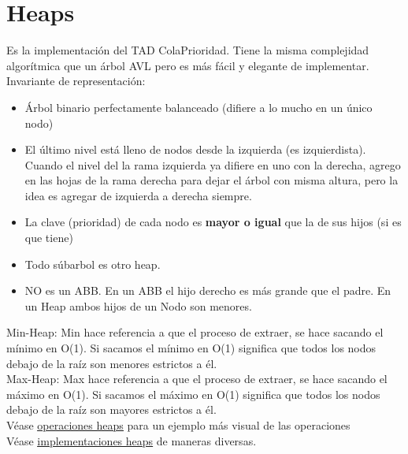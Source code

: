 \documentclass[10pt,a4paper]{article}
\begin{document}
\section*{Heaps}
Es la implementación del TAD ColaPrioridad. Tiene la misma complejidad algorítmica que un árbol AVL pero es más fácil y elegante de implementar. \\
Invariante de representación:
\begin{itemize}
    \item Árbol binario perfectamente balanceado (difiere a lo mucho en un único nodo)
    \item El último nivel está lleno de nodos desde la izquierda (es izquierdista). Cuando el nivel del la rama izquierda ya difiere en uno con la derecha, agrego en las hojas de la rama derecha para dejar el árbol con misma altura, pero la idea es agregar de izquierda a derecha siempre. 
    \item La clave (prioridad) de cada nodo es \textbf{mayor o igual} que la de sus hijos (si es que tiene)
    \item Todo súbarbol es otro heap. 
    \item NO es un ABB. En un ABB el hijo derecho es más grande que el padre. En un Heap ambos hijos de un Nodo son menores.
\end{itemize}
Min-Heap: Min hace referencia a que el proceso de extraer, se hace sacando el mínimo en O(1). Si sacamos el mínimo en O(1) significa que todos los nodos debajo de la raíz son menores estrictos a él. \\
Max-Heap: Max hace referencia a que el proceso de extraer, se hace sacando el máximo en O(1). Si sacamos el máximo en O(1) significa que todos los nodos debajo de la raíz son mayores estrictos a él. \\

Véase \hyperref[subsec:operaciones_heaps]{\underline{operaciones heaps}} para un ejemplo más visual de las operaciones \\
Véase \hyperref[subsec:implementaciones_heap]{\underline{implementaciones heaps}} de maneras diversas.
\end{document}
